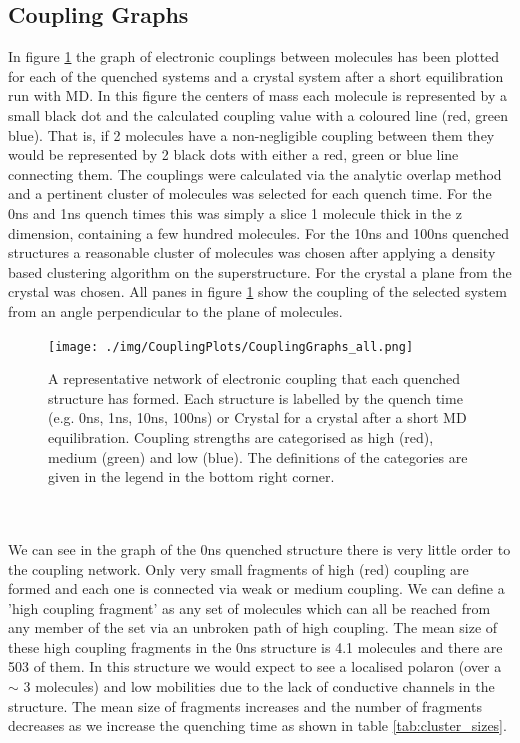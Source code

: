 \subsection{Coupling Graphs}
\label{sect:couplGraphs}
In figure \ref{fig:crystalCouplingGraph} the graph of electronic couplings between molecules has been plotted for each of the quenched systems and a crystal system after a short equilibration run with MD. In this figure the centers of mass each molecule is represented by a small black dot and the calculated coupling value with a coloured line (red, green blue). That is, if 2 molecules have a non-negligible coupling between them they would be represented by 2 black dots with either a red, green or blue line connecting them. The couplings were calculated via the analytic overlap method \cite{gajdos_ultrafast_2014} and a pertinent cluster of molecules was selected for each quench time. For the 0ns and 1ns quench times this was simply a slice 1 molecule thick in the z dimension, containing a few hundred molecules. For the 10ns and 100ns quenched structures a reasonable cluster of molecules was chosen after applying a density based clustering algorithm on the superstructure. For the crystal a plane from the crystal was chosen. All panes in figure \ref{fig:crystalCouplingGraph} show the coupling of the selected system from an angle perpendicular to the plane of molecules.
\begin{figure}
	\texttt{[image: ./img/CouplingPlots/CouplingGraphs\_all.png]}
	\caption{\label{fig:crystalCouplingGraph}A representative network of electronic coupling that each quenched structure has formed. Each structure is labelled by the quench time (e.g. 0ns, 1ns, 10ns, 100ns) or Crystal for a crystal after a short MD equilibration. Coupling strengths are categorised as high (red), medium (green) and low (blue). The definitions of the categories are given in the legend in the bottom right corner.}
\end{figure}
\\\\
We can see in the graph of the 0ns quenched structure there is very little order to the coupling network. Only very small fragments of high (red) coupling are formed and each one is connected via weak or medium coupling. We can define a 'high coupling fragment' as any set of molecules which can all be reached from any member of the set via an unbroken path of high coupling. The mean size of these high coupling fragments in the 0ns structure is 4.1 molecules and there are 503 of them. In this structure we would expect to see a localised polaron (over a $\sim$ 3 molecules) and low mobilities due to the lack of conductive channels in the structure. The mean size of fragments increases and the number of fragments decreases as we increase the quenching time as shown in table \ref{tab:cluster_sizes}.
